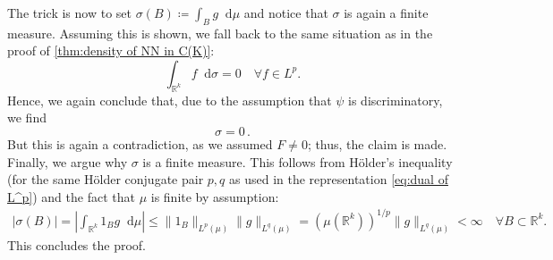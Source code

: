 \documentclass[11pt,a4paper,twoside,openany]{report}
\newcommand{\diff}{\mathop{}\!\mathrm{d}}
\theoremstyle{plain} %
\theoremstyle{definition} %
\theoremstyle{remark} %
\begin{document}
The trick is now to set \(\sigma(B)\coloneqq\int_B g\diff \mu\) and notice that \(\sigma\) is again a finite measure. Assuming this is shown, we fall back to the same situation as in the proof of \cref{thm:density of NN in C(K)}:
\begin{equation}
        \int_{\mathbb{R}^k}f\diff \sigma=0\quad\forall f\in L^p.
    \end{equation}
    Hence, we again conclude that, due to the assumption that \(\psi\) is discriminatory, we find
    \begin{equation}
        \sigma = 0\,.
    \end{equation}
    But this is again a contradiction, as we assumed \(F\neq 0\); thus, the claim is made. Finally, we argue why \(\sigma\) is a finite measure. 
    This follows from Hölder's inequality (for the same Hölder conjugate pair \(p,q\) as used in the representation \cref{eq:dual of L^p}) and the fact that \(\mu\) is finite by assumption:
    \begin{align*}
        |\sigma(B)|=|\int_{\mathbb{R}^k}1_B g\diff \mu|\leq \lVert 1_{B}\rVert_{L^p(\mu)}\lVert g \rVert_{L^q(\mu)}=(\mu(\mathbb{R}^k))^{1/p}\lVert g\rVert_{L^q(\mu)}<\infty\quad\forall B\subset \mathbb{R}^k.
    \end{align*}
    This concludes the proof.
\end{document}
